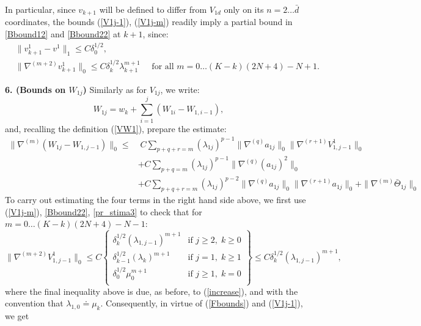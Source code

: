 \documentclass[reqno,twoside,11pt]{amsart}
\numberwithin{equation}{section}
\theoremstyle{plain}
\theoremstyle{definition}
\begin{document}
In particular, since $v_{k+1}$ will be defined to differ from
$V_{1d}$ only on its $n=2\ldots \bar d$ coordinates, the bounds (\ref{V1j-1}),
(\ref{V1j-m}) readily imply a partial bound in \ref{Bbound12}
and \ref{Bbound22} at $k+1$, since:
\begin{equation}\label{fin1}
\begin{split}
& \|v_{k+1}^1-v^1\|_1\leq C\delta_0^{1/2}, \\
& \|\nabla^{(m+2)}v_{k+1}^1\|_0 \leq C \delta_k^{1/2}
\lambda_{k+1}^{m+1} \quad \mbox{ for all } m=0\ldots (K-k)(2N+4)-N+1.
\end{split}
\end{equation}

\medskip

{\bf 6. (Bounds on $W_{1j}$)} Similarly as for $V_{1j}$, we write:
$$W_{1j} = w_k + \sum_{i=1}^j (W_{1i}-W_{1,i-1}),$$
and, recalling the definition (\ref{VW1}), prepare the estimate:
\begin{equation}\label{W1j-diff}
\begin{split}
\|\nabla^{(m)}(W_{1j}-W_{1,j-1})\|_0  \leq & \; C\sum_{p+q+r=m}
(\lambda_{1j})^{p-1}\|\nabla^{(q)}a_{1j} \|_0\|\nabla^{(r+1)}V_{1, j-1}^1\|_0
\\ & + C\sum_{p+q=m} (\lambda_{1j})^{p-1}\|\nabla^{(q)}(a_{1j})^2 \|_0
\\ & + C\sum_{p+q+r=m}
(\lambda_{1j})^{p-2}\|\nabla^{(q)}a_{1j} \|_0 \|\nabla^{(r+1)}a_{1j}
\|_0 + \|\nabla^{(m)}\bar\Theta_{1j}\|_0
\end{split}
\end{equation}
To carry out estimating the four terms in the right hand side above, we first use
(\ref{V1j-m}), \ref{Bbound22}, \ref{pr_stima3} to check that for
$m=0\ldots (K-k)(2N+4)-N-1$:
\begin{equation}\label{Vj-1}
\|\nabla^{(m+2)}V_{1, j-1}^1\|_0\leq C \left\{\begin{array}{ll}
    \delta_k^{1/2}(\lambda_{1,j-1})^{m+1} & \mbox{if } j\geq 2, \; k\geq 0\\
\delta_{k-1}^{1/2} (\lambda_k)^{m+1} & \mbox{if } j=1, \; k\geq 1\\
\delta_0^{1/2}\mu_0^{m+1} & \mbox{if } j\geq 1, \; k=0\\
\end{array}\right\} \leq C\delta_k^{1/2}(\lambda_{1,j-1})^{m+1},
\end{equation}
where the final inequality above is due, as before, to
(\ref{increase}), and with the convention that $\lambda_{1,0}\doteq\mu_k$. 
Consequently, in virtue of (\ref{Fbounds}) and  (\ref{V1j-1}), we get
\end{document}
